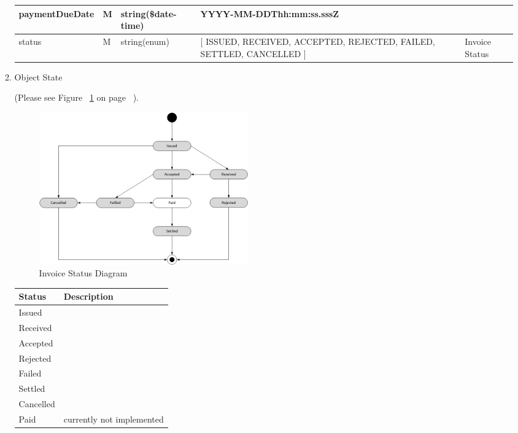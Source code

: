 \begin{enumerate}
\begin{enumerate}
\begin{table}[H]
\begin{center}
\begin{tabular}{|p{3cm}|l|p{3cm}|p{3cm}|p{4cm}|}
paymentDueDate			& M & string(\$date-time) 	&  YYYY-MM-DDThh:mm:ss.sssZ	&  \\
\hline

status					& M & string(enum)			& [ ISSUED, RECEIVED, ACCEPTED, REJECTED, FAILED, SETTLED, CANCELLED ] & Invoice Status \\
\hline
			
\end{tabular}
\end{center}
\end{table}

\item Object State

(Please see Figure ~\ref{fig:ISD} on page ~\pageref{fig:ISD}).

\begin{figure}[H]
    \centering
    \includegraphics[width=9cm,angle=0]{./diag/Reference/InvoiceState-Reference.png}
	\caption{Invoice Status Diagram}
    \label{fig:ISD}
\end{figure}

\begin{table}[H]
\footnotesize

\begin{center}
\begin{tabular}{|p{3cm}|p{11cm}|} 
\hline
\rowcolor{lightgray}	Status	& 	Description \\
\hline

Issued		&	 	\\
\hline
Received	&		\\
\hline
Accepted 	& 		\\
\hline
Rejected 	&		\\
\hline
Failed		&		\\
\hline
Settled		&		\\
\hline
Cancelled	&		\\
\hline
Paid		&	currently not implemented	\\
\hline


\end{tabular}
\end{center}
\end{table}
\end{enumerate}
\end{enumerate}
